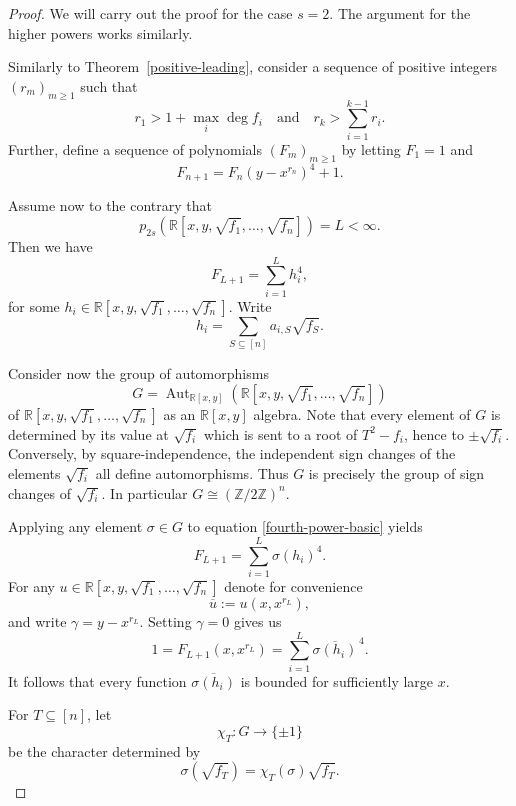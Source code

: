 \documentclass[12pt,reqno]{amsart}   	%
\theoremstyle{remark}
\newcommand{\R}{\mathbb{R}}
\newcommand{\brac}[1]{\left ( #1 \right )}
\begin{document}
\begin{proof}
    We will carry out the proof for the case $s=2$. The argument for the higher powers works similarly.

    Similarly to Theorem~\ref{positive-leading}, consider a sequence of positive integers $(r_m)_{m\geq1}$ such that
    \[
    r_1>1+\max_i \deg f_i\quad \text{and} \quad r_k>\sum_{i=1}^{k-1} r_i. 
    \]
    Further, define a sequence of polynomials $(F_m)_{m\geq 1}$ by letting $F_1=1$ and
    \[
    F_{n+1} = F_n\brac{y-x^{r_n}}^4+1.
    \]

    Assume now to the contrary that
    \[
     p_{2s}\brac{\R[x,y,\sqrt{f_1},\dots, \sqrt{f_n}]} = L<\infty.
    \]
    Then we have
    \begin{equation}
     F_{L+1} = \sum_{i=1}^L h_i^4,
        \label{fourth-power-basic}
    \end{equation}
    for some $h_i\in \R[x,y,\sqrt{f_1},\dots, \sqrt{f_n}]$. Write
    \[
    h_i=\sum_{S\subseteq[n]}a_{i,S}\sqrt{f_S}.
    \]

    Consider now the group of automorphisms
    \[
    G = \operatorname{Aut}_{\mathbb R[x,y]}\brac{\R[x,y,\sqrt{f_1},\dots, \sqrt{f_n}]}
    \]
    of $\R[x,y,\sqrt{f_1},\dots, \sqrt{f_n}]$ as an $\R[x,y]$ algebra. 
    Note that every element of $G$ is determined by its value at $\sqrt{f_i}$ which is sent to a root of $T^2-f_i$, hence to $\pm\sqrt{f_i}$. Conversely, by square-independence, the independent sign changes of the elements $\sqrt{f_i}$ all define automorphisms. Thus $G$ is precisely the group of sign changes of $\sqrt{f_i}$. In particular $G\cong(\mathbb Z/2\mathbb Z)^n$.
    
    Applying any element $\sigma\in G$ to equation \eqref{fourth-power-basic} yields
    \[
    F_{L+1} = \sum_{i=1}^L \sigma(h_i)^4.
    \]
    For any $u\in\R[x,y,\sqrt{f_1},\dots, \sqrt{f_n}]$ denote for convenience
    \[
    \overline{u} := u(x,x^{r_L}),
    \]
    and write $\gamma = y-x^{r_L}$. Setting $\gamma=0$ gives us
    \[
    1 = F_{L+1}(x,x^{r_L}) = \sum_{i=1}^L\overline{\sigma(h_i)}^{\, 4}.
    \]
    It follows that every function $\overline{\sigma(h_i)}$ is bounded for sufficiently large $x$.

    For $T\subseteq[n]$, let 
    \[
    \chi_T:G\longrightarrow\{\pm1\}
    \]
    be the character determined by
    \[
    \sigma(\sqrt{f_T}) = \chi_T(\sigma)\sqrt{f_T}.
    \]
    

\end{proof}
\end{document}
